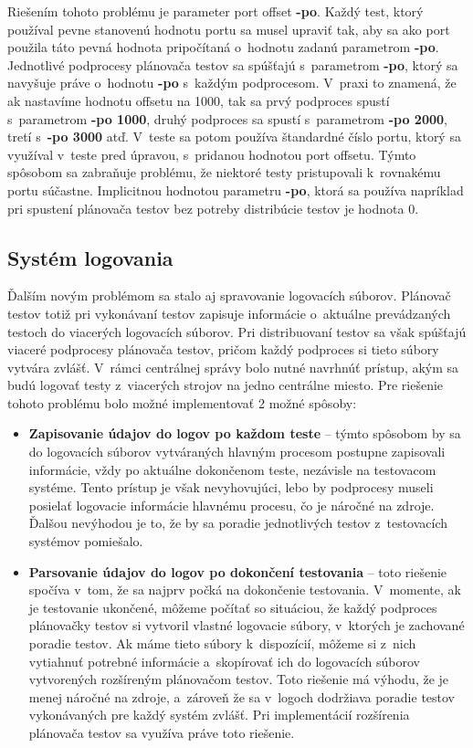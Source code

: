 Riešením tohoto problému je parameter port offset \textbf{-po}. 
Každý test, ktorý používal pevne stanovenú hodnotu portu sa musel upraviť tak, aby 
sa ako port použila táto pevná hodnota pripočítaná o~hodnotu zadanú parametrom \textbf{-po}.
Jednotlivé podprocesy plánovača testov sa spúšťajú s~parametrom \textbf{-po}, ktorý sa
navyšuje práve o~hodnotu \textbf{-po} s~každým podprocesom.
V~praxi to znamená, že ak nastavíme hodnotu offsetu na 1000, tak sa prvý podproces spustí s~parametrom
\textbf{-po 1000}, druhý podproces sa spustí s~parametrom \textbf{-po 2000}, tretí s~\textbf{-po 3000} atď.
V~teste sa potom používa štandardné číslo portu, ktorý sa využíval v~teste pred úpravou, s~pridanou hodnotou port offsetu.
Týmto spôsobom sa zabraňuje problému, že niektoré testy pristupovali k~rovnakému portu súčastne.
Implicitnou hodnotou parametru \textbf{-po}, ktorá sa používa napríklad pri spustení plánovača testov
bez potreby distribúcie testov je hodnota 0. 

\subsection*{Systém logovania}
Ďalším novým problémom sa stalo aj spravovanie logovacích súborov. Plánovač testov totiž
pri vykonávaní testov zapisuje informácie o~aktuálne prevádzaných testoch do viacerých logovacích súborov.
Pri distribuovaní testov sa však spúšťajú viaceré podprocesy plánovača testov, pričom každý podproces
si tieto súbory vytvára zvlášť. V~rámci centrálnej správy bolo nutné navrhnúť prístup, akým sa budú
logovať testy z~viacerých strojov na jedno centrálne miesto.
Pre riešenie tohoto problému bolo možné implementovať 2 možné spôsoby:
\begin{itemize}
\item \textbf{Zapisovanie údajov do logov po každom teste} -- týmto spôsobom by sa do logovacích súborov vytváraných hlavným procesom
postupne zapisovali informácie, vždy po aktuálne dokončenom teste, nezávisle na testovacom systéme.
Tento prístup je však nevyhovujúci, lebo by podprocesy museli posielať logovacie informácie hlavnému procesu, čo je náročné na zdroje.
Ďalšou nevýhodou je to, že by sa poradie jednotlivých testov z~testovacích systémov pomiešalo.
\item \textbf{Parsovanie údajov do logov po dokončení testovania} -- toto riešenie spočíva v~tom, že
sa najprv počká na dokončenie testovania. V~momente, ak je testovanie ukončené, môžeme počítať so situáciou,
že každý podproces plánovačky testov si vytvoril vlastné logovacie súbory, v~ktorých je zachované poradie testov.
Ak máme tieto súbory k~dispozícií, môžeme si z~nich vytiahnuť potrebné informácie a~skopírovať ich do logovacích
súborov vytvorených rozšíreným plánovačom testov. Toto riešenie má výhodu, že je menej náročné na zdroje, a~zároveň
že sa v~logoch dodržiava poradie testov vykonávaných pre každý systém zvlášť. 
Pri implementácií rozšírenia plánovača testov sa využíva práve toto riešenie.
\end{itemize} 



